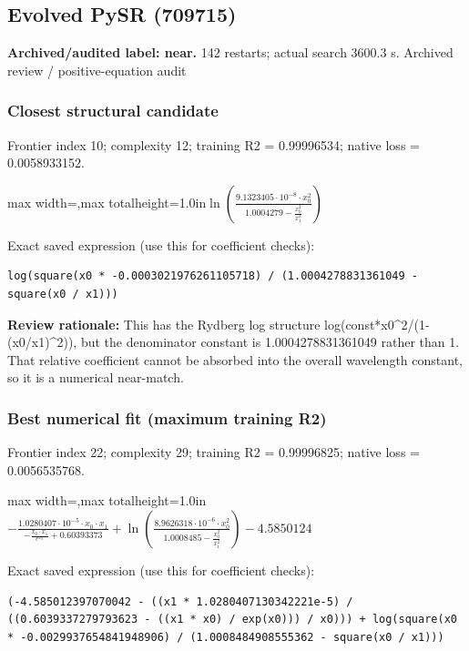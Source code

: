 \documentclass[10pt,letterpaper,landscape]{article}
\begin{document}
\begin{minipage}[t]{0.485\textwidth}
\subsection*{Evolved PySR (709715)}
\textbf{Archived/audited label: near.} 142 restarts; actual search 3600.3 s.
{\small Archived review / positive-equation audit}
\subsubsection*{Closest structural candidate}
Frontier index 10; complexity 12; training R2 = 0.99996534; native loss = 0.0058933152.
\begin{center}\begin{adjustbox}{max width=\linewidth,max totalheight=1.0in}$\displaystyle \ln{\left(\frac{9.1323405 \cdot 10^{-8} \cdot x_{0}^{2}}{1.0004279 - \frac{x_{0}^{2}}{x_{1}^{2}}} \right)}$\end{adjustbox}\end{center}
{\scriptsize Exact saved expression (use this for coefficient checks):}
\begin{lstlisting}
log(square(x0 * -0.0003021976261105718) / (1.0004278831361049 - square(x0 / x1)))
\end{lstlisting}
{\small\textbf{Review rationale:} This has the Rydberg log structure log(const*x0\textasciicircum{}2/(1-(x0/x1)\textasciicircum{}2)), but the denominator constant is 1.0004278831361049 rather than 1. That relative coefficient cannot be absorbed into the overall wavelength constant, so it is a numerical near-match.}
\subsubsection*{Best numerical fit (maximum training R2)}
Frontier index 22; complexity 29; training R2 = 0.99996825; native loss = 0.0056535768.
\begin{center}\begin{adjustbox}{max width=\linewidth,max totalheight=1.0in}$\displaystyle - \frac{1.0280407 \cdot 10^{-5} \cdot x_{0} \cdot x_{1}}{- \frac{x_{0} \cdot x_{1}}{e^{x_{0}}} + 0.60393373} + \ln{\left(\frac{8.9626318 \cdot 10^{-6} \cdot x_{0}^{2}}{1.0008485 - \frac{x_{0}^{2}}{x_{1}^{2}}} \right)} - 4.5850124$\end{adjustbox}\end{center}
{\scriptsize Exact saved expression (use this for coefficient checks):}
\begin{lstlisting}
(-4.585012397070042 - ((x1 * 1.0280407130342221e-5) / ((0.6039337279793623 - ((x1 * x0) / exp(x0))) / x0))) + log(square(x0 * -0.0029937654841948906) / (1.0008484908555362 - square(x0 / x1)))
\end{lstlisting}
\end{minipage}
\clearpage{}\label{rydberg-10004}
\end{document}
